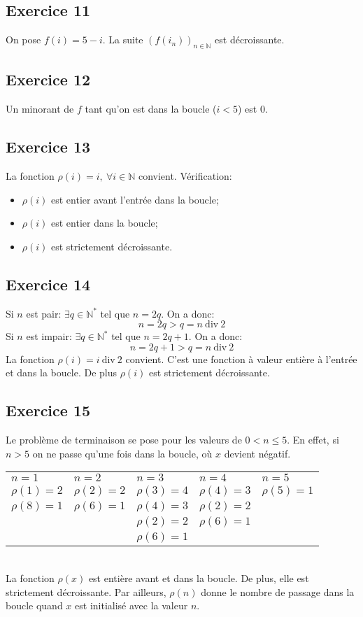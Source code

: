 \documentclass{article}
\begin{document}
\subsection*{Exercice 11}
On pose $f(i)=5-i$. La suite $(f(i_n))_{n \in \mathbb{N}}$ est décroissante.

\subsection*{Exercice 12}
Un minorant de $f$ tant qu'on est dans la boucle ($i<5$) est $0$.

\subsection*{Exercice 13}
La fonction $\rho(i)=i,\ \forall i \in \mathbb{N}$ convient. Vérification:
\begin{itemize}
\item $\rho(i)$ est entier avant l'entrée dans la boucle;
\item $\rho(i)$ est entier dans la boucle;
\item $\rho(i)$ est strictement décroissante.
\end{itemize}

\subsection*{Exercice 14}
Si $n$ est pair: $\exists q \in \mathbb{N^*}$ tel que $n=2q$. On a donc:
$$ n=2q > q= n\ \mbox{div}\ 2$$
Si $n$ est impair: $\exists q \in \mathbb{N^*}$ tel que $n=2q+1$. On a donc:
$$n=2q+1>q= n\ \mbox{div}\ 2 $$
La fonction $\rho(i)=i\ \mbox{div}\ 2$ convient. C'est une fonction à valeur entière à l'entrée et dans la boucle. De plus $\rho(i)$ est strictement décroissante.

\subsection*{Exercice 15}
Le problème de terminaison se pose pour les valeurs de $0<n\le 5$. En effet, si $n>5$ on ne passe qu'une fois dans la boucle, où $x$ devient négatif.\\
\begin{tabular}{lllll}
$n=1$&$n=2$&$n=3$&$n=4$&$n=5$\\
$\rho(1)=2$&$\rho(2)=2$&$\rho(3)=4$&$\rho(4)=3$&$\rho(5)=1$\\
$\rho(8)=1$&$\rho(6)=1$&$\rho(4)=3$&$\rho(2)=2$&\\
&&$\rho(2)=2$&$\rho(6)=1$&\\
&&$\rho(6)=1$&&\\
\end{tabular}
\\
La fonction $\rho(x)$ est entière avant et dans la boucle. De plus, elle est strictement décroissante. Par ailleurs, $\rho(n)$ donne le nombre de passage dans la boucle quand $x$ est initialisé avec la valeur $n$.
\end{document}

